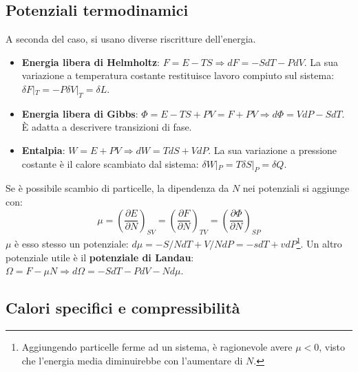 \documentclass[10pt, a4paper]{scrartcl}
\numberwithin{equation}{subsection}
\theoremstyle{style1}
\theoremstyle{style2}
\begin{document}
\subsection{Potenziali termodinamici}
A seconda del caso, si usano diverse riscritture dell'energia.
\begin{itemize}
	\item \textbf{Energia libera di Helmholtz}: $F = E - TS \Rightarrow dF = -SdT - PdV$. La sua variazione a temperatura costante restituisce lavoro compiuto sul sistema: $\delta F |_T = - P \delta V |_T = \delta L$.
	\item \textbf{Energia libera di Gibbs}: $\Phi = E - TS + PV = F + PV \Rightarrow d\Phi=  VdP - SdT$. \`E adatta a descrivere transizioni di fase.
	\item \textbf{Entalpia}: $W = E + PV \Rightarrow dW=  TdS + VdP$. La sua variazione a pressione costante \`e il calore scambiato dal sistema: $\delta W|_P = T \delta S|_P = \delta Q$.
\end{itemize}
Se \`e possibile scambio di particelle, la dipendenza da $N$ nei potenziali si aggiunge con:
\begin{equation}
	\mu = \left(\frac{\partial E}{\partial N} \right) _{SV} = \left(\frac{\partial F}{\partial N} \right) _{TV} = \left(\frac{\partial \Phi}{\partial N} \right) _{SP} 
\end{equation}
$\mu $ \`e esso stesso un potenziale: $d\mu = - S / N dT + V / N dP = - s dT + vdP$\footnote{Aggiungendo particelle ferme ad un sistema, \`e ragionevole avere $\mu < 0$, visto che l'energia media diminuirebbe con l'aumentare di $N$.}. Un altro potenziale utile \`e il \textbf{potenziale di Landau}: $\Omega = F - \mu N\Rightarrow d\Omega = -SdT - PdV - N d\mu $.



\subsection{Calori specifici e compressibilit\`a}
\end{document}
